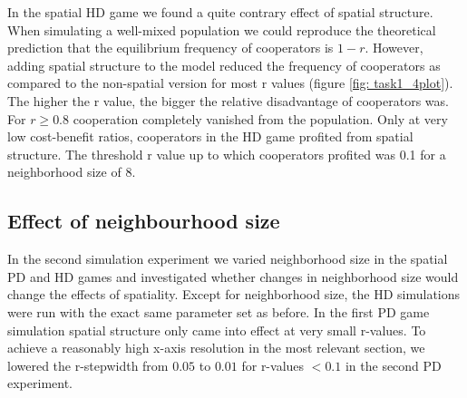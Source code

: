 In the spatial HD game we found a quite contrary effect of spatial structure. When simulating a well-mixed population we could reproduce the theoretical prediction that the equilibrium frequency of cooperators is $1 - r$. However, adding spatial structure to the model reduced the frequency of cooperators as compared to the non-spatial version for most r values (figure \ref{fig: task1_4plot}). The higher the r value, the bigger the relative disadvantage of cooperators was. For $r \geq 0.8$ cooperation completely vanished from the population. Only at very low cost-benefit ratios, cooperators in the HD game profited from spatial structure. The threshold r value up to which cooperators profited was 0.1 for a neighborhood size of 8.



\subsection{Effect of neighbourhood size}

In the second simulation experiment we varied neighborhood size in the spatial PD and HD games and investigated whether changes in neighborhood size would change the effects of spatiality. Except for neighborhood size, the HD simulations were run with the exact same parameter set as before. In the first PD game simulation spatial structure only came into effect at very small r-values. To achieve a reasonably high x-axis resolution in the most relevant section, we lowered the r-stepwidth from $0.05$ to $0.01$ for r-values $< 0.1$ in the second PD experiment.

